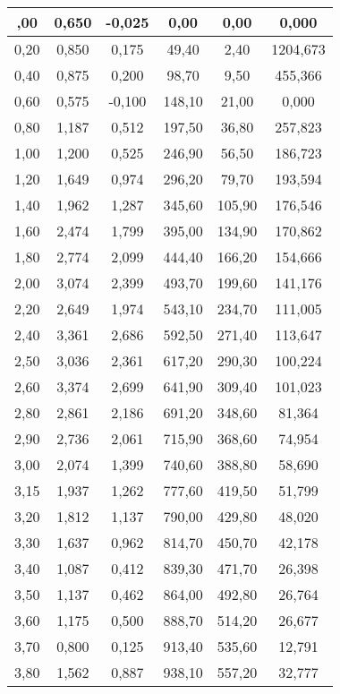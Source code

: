 \documentclass[a4paper, 12pt]{article}
\begin{document}
\begin{longtable}{|c|c|c|c|c|c|}
	\endlastfoot
0,00 & 0,650 & -0,025 & 0,00     & 0,00   & 0,000    \\ \hline
0,20 & 0,850 & 0,175  & 49,40    & 2,40   & 1204,673 \\ \hline
0,40 & 0,875 & 0,200  & 98,70    & 9,50   & 455,366  \\ \hline
0,60 & 0,575 & -0,100 & 148,10   & 21,00  & 0,000    \\ \hline
0,80 & 1,187 & 0,512  & 197,50   & 36,80  & 257,823  \\ \hline
1,00 & 1,200 & 0,525  & 246,90   & 56,50  & 186,723  \\ \hline
1,20 & 1,649 & 0,974  & 296,20   & 79,70  & 193,594  \\ \hline
1,40 & 1,962 & 1,287  & 345,60   & 105,90 & 176,546  \\ \hline
1,60 & 2,474 & 1,799  & 395,00   & 134,90 & 170,862  \\ \hline
1,80 & 2,774 & 2,099  & 444,40   & 166,20 & 154,666  \\ \hline
2,00 & 3,074 & 2,399  & 493,70   & 199,60 & 141,176  \\ \hline
2,20 & 2,649 & 1,974  & 543,10   & 234,70 & 111,005  \\ \hline
2,40 & 3,361 & 2,686  & 592,50   & 271,40 & 113,647  \\ \hline
2,50 & 3,036 & 2,361  & 617,20   & 290,30 & 100,224  \\ \hline
2,60 & 3,374 & 2,699  & 641,90   & 309,40 & 101,023  \\ \hline
2,80 & 2,861 & 2,186  & 691,20   & 348,60 & 81,364   \\ \hline
2,90 & 2,736 & 2,061  & 715,90   & 368,60 & 74,954   \\ \hline
3,00 & 2,074 & 1,399  & 740,60   & 388,80 & 58,690   \\ \hline
3,15 & 1,937 & 1,262  & 777,60   & 419,50 & 51,799   \\ \hline
3,20 & 1,812 & 1,137  & 790,00   & 429,80 & 48,020   \\ \hline
3,30 & 1,637 & 0,962  & 814,70   & 450,70 & 42,178   \\ \hline
3,40 & 1,087 & 0,412  & 839,30   & 471,70 & 26,398   \\ \hline
3,50 & 1,137 & 0,462  & 864,00   & 492,80 & 26,764   \\ \hline
3,60 & 1,175 & 0,500  & 888,70   & 514,20 & 26,677   \\ \hline
3,70 & 0,800 & 0,125  & 913,40   & 535,60 & 12,791   \\ \hline
3,80 & 1,562 & 0,887  & 938,10   & 557,20 & 32,777   \\ \hline

\end{longtable}
\end{document}
